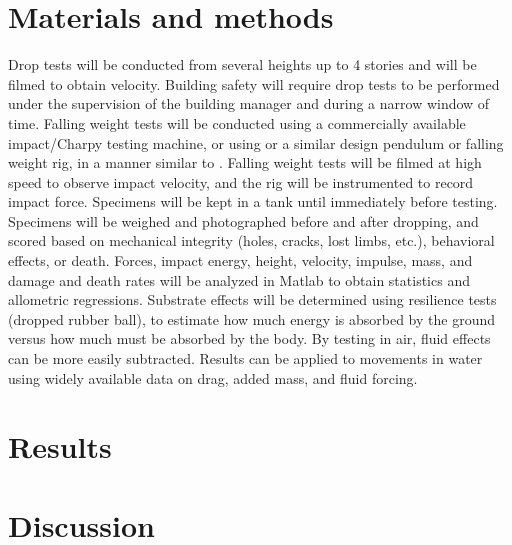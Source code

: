 \documentclass{jeb}
\begin{document}
\section{Materials and methods}
Drop tests will be conducted from several heights up to 4 stories and will be filmed to obtain velocity.  Building safety will require drop tests to be performed under the supervision of the building manager and during a narrow window of time.  Falling weight tests will be conducted using a commercially available impact/Charpy testing machine, or using or a similar design pendulum or falling weight rig, in a manner similar to \citet{Strathmann:1981}.  Falling weight tests will be filmed at high speed to observe impact velocity, and the rig will be instrumented to record impact force.  Specimens will be kept in a tank until immediately before testing.  Specimens will be weighed and photographed before and after dropping, and scored based on mechanical integrity (holes, cracks, lost limbs, etc.), behavioral effects, or death.  Forces, impact energy, height, velocity, impulse, mass, and damage and death rates will be analyzed in Matlab to obtain statistics and allometric regressions.  Substrate effects will be determined using resilience tests (dropped rubber ball), to estimate how much energy is absorbed by the ground versus how much must be absorbed by the body.  By testing in air, fluid effects can be more easily subtracted.  Results can be applied to movements in water using widely available data on drag, added mass, and fluid forcing. 

\section{Results}
\section{Discussion}



\end{document}

